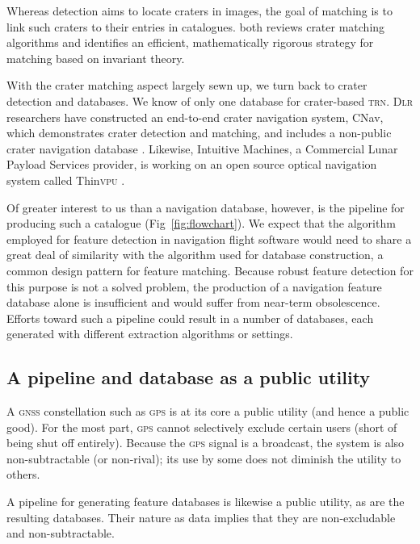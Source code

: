 \documentclass[12pt]{article}
\begin{document}
Whereas detection aims to locate craters in images, the goal of matching is to link such craters to their entries in catalogues. \citet{Christian2020} both reviews crater matching algorithms and identifies an efficient, mathematically rigorous strategy for matching based on invariant theory.

With the crater matching aspect largely sewn up, we turn back to crater detection and databases. We know of only one database for crater-based \textsc{trn}. \textsc{Dlr} researchers have constructed an end-to-end crater navigation system, CNav, which demonstrates crater detection and matching, and includes a non-public crater navigation database \citep{Maass2016,Maass2020}. Likewise, Intuitive Machines, a Commercial Lunar Payload Services provider, is working on an open source optical navigation system called Thin\textsc{vpu} \citep{Stewart2020}.

Of greater interest to us than a navigation database, however, is the pipeline for producing such a catalogue (Fig~\ref{fig:flowchart}). We expect that the algorithm employed for feature detection in navigation flight software would need to share a great deal of similarity with the algorithm used for database construction, a common design pattern for feature matching. Because robust feature detection for this purpose is not a solved problem, the production of a navigation feature database alone is insufficient and would suffer from near-term obsolescence. Efforts toward such a pipeline could result in a number of databases, each generated with different extraction algorithms or settings.

\subsection{A pipeline and database as a public utility}
A \textsc{gnss} constellation such as \textsc{gps} is at its core a public utility (and hence a public good). For the most part, \textsc{gps} cannot selectively exclude certain users (short of being shut off entirely). Because the \textsc{gps} signal is a broadcast, the system is also non-subtractable (or non-rival); its use by some does not diminish the utility to others.

A pipeline for generating feature databases is likewise a public utility, as are the resulting databases. Their nature as data implies that they are non-excludable and non-subtractable.
\end{document}

